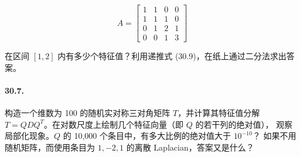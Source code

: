 \documentclass[UTF8,fontset=none,12pt]{ctexart}
\begin{document}
$$
A=\begin{bmatrix}
1&1&0&0\\
1&1&1&0\\
0&1&2&1\\
0&0&1&3
\end{bmatrix}
$$

在区间 $[1,2]$ 内有多少个特征值？利用递推式 (30.9)，在纸上通过二分法求出答案。

\paragraph{30.7.}
构造一个维数为 100 的随机实对称三对角矩阵 $T$，并计算其特征值分解
$T=QDQ^T$。在对数尺度上绘制几个特征向量（即 $Q$ 的若干列的绝对值），
观察局部化现象。$Q$ 的 10,000 个条目中，有多大比例的绝对值大于 $10^{-10}$？
如果不用随机矩阵，而使用条目为 $1,-2,1$ 的离散 Laplacian，答案又是什么？
\end{document}
